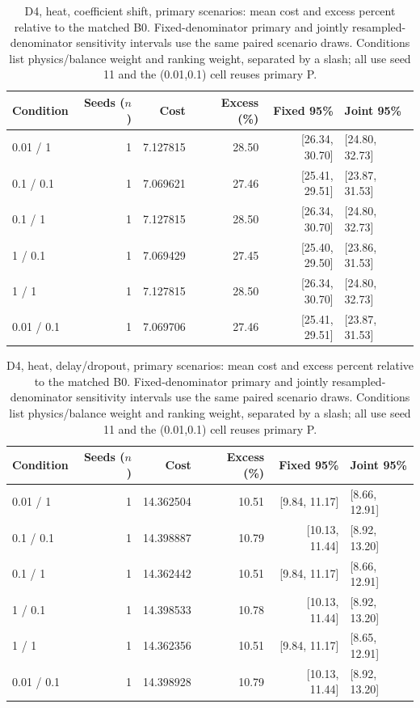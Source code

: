 \begin{table}[ht]
\centering\small
\caption{D4, heat, coefficient shift, primary scenarios: mean cost and excess percent relative to the matched B0. Fixed-denominator primary and jointly resampled-denominator sensitivity intervals use the same paired scenario draws. Conditions list physics/balance weight and ranking weight, separated by a slash; all use seed 11 and the (0.01,0.1) cell reuses primary P.}\label{tab:revision_cost_E4_heat_locked_coefficient_ood}
\begin{tabular}{@{}lrrrrl@{}}\toprule
Condition & Seeds ($n$) & Cost & Excess (\%) & Fixed 95\% & Joint 95\%\\\midrule
0.01 / 1 & 1 & 7.127815 & 28.50 & [26.34, 30.70] & [24.80, 32.73]\\
0.1 / 0.1 & 1 & 7.069621 & 27.46 & [25.41, 29.51] & [23.87, 31.53]\\
0.1 / 1 & 1 & 7.127815 & 28.50 & [26.34, 30.70] & [24.80, 32.73]\\
1 / 0.1 & 1 & 7.069429 & 27.45 & [25.40, 29.50] & [23.86, 31.53]\\
1 / 1 & 1 & 7.127815 & 28.50 & [26.34, 30.70] & [24.80, 32.73]\\
0.01 / 0.1 & 1 & 7.069706 & 27.46 & [25.41, 29.51] & [23.87, 31.53]\\
\bottomrule\end{tabular}
\end{table}

\begin{table}[ht]
\centering\small
\caption{D4, heat, delay/dropout, primary scenarios: mean cost and excess percent relative to the matched B0. Fixed-denominator primary and jointly resampled-denominator sensitivity intervals use the same paired scenario draws. Conditions list physics/balance weight and ranking weight, separated by a slash; all use seed 11 and the (0.01,0.1) cell reuses primary P.}\label{tab:revision_cost_E4_heat_locked_delay_dropout}
\begin{tabular}{@{}lrrrrl@{}}\toprule
Condition & Seeds ($n$) & Cost & Excess (\%) & Fixed 95\% & Joint 95\%\\\midrule
0.01 / 1 & 1 & 14.362504 & 10.51 & [9.84, 11.17] & [8.66, 12.91]\\
0.1 / 0.1 & 1 & 14.398887 & 10.79 & [10.13, 11.44] & [8.92, 13.20]\\
0.1 / 1 & 1 & 14.362442 & 10.51 & [9.84, 11.17] & [8.66, 12.91]\\
1 / 0.1 & 1 & 14.398533 & 10.78 & [10.13, 11.44] & [8.92, 13.20]\\
1 / 1 & 1 & 14.362356 & 10.51 & [9.84, 11.17] & [8.65, 12.91]\\
0.01 / 0.1 & 1 & 14.398928 & 10.79 & [10.13, 11.44] & [8.92, 13.20]\\
\bottomrule\end{tabular}
\end{table}

